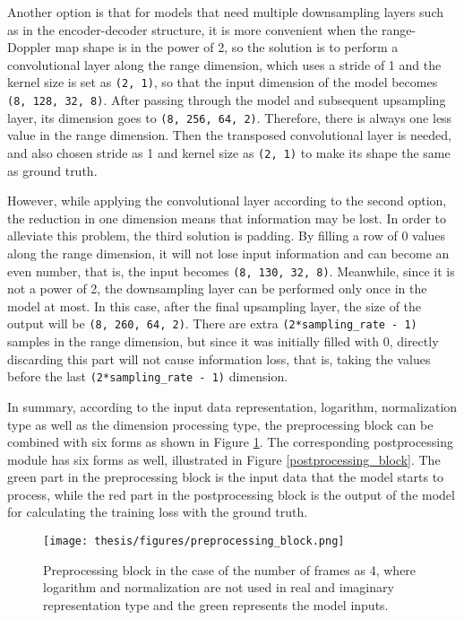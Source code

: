 Another option is that for models that need multiple downsampling layers such as in the encoder-decoder structure, it is more convenient when the range-Doppler map shape is in the power of 2, so the solution is to perform a convolutional layer along the range dimension, which uses a stride of 1 and the kernel size is set as \texttt{(2, 1)}, so that the input dimension of the model becomes \texttt{(8, 128, 32, 8)}. After passing through the model and subsequent upsampling layer, its dimension goes to \texttt{(8, 256, 64, 2)}. Therefore, there is always one less value in the range dimension. Then the transposed convolutional layer is needed, and also chosen stride as 1 and kernel size as \texttt{(2, 1)} to make its shape the same as ground truth.

However, while applying the convolutional layer according to the second option, the reduction in one dimension means that information may be lost. In order to alleviate this problem, the third solution is padding. By filling a row of 0 values along the range dimension, it will not lose input information and can become an even number, that is, the input becomes \texttt{(8, 130, 32, 8)}. Meanwhile, since it is not a power of 2, the downsampling layer can be performed only once in the model at most. In this case, after the final upsampling layer, the size of the output will be \texttt{(8, 260, 64, 2)}. There are extra \texttt{(2*sampling\_rate - 1)} samples in the range dimension, but since it was initially filled with 0, directly discarding this part will not cause information loss, that is, taking the values before the last \texttt{(2*sampling\_rate - 1)} dimension.

In summary, according to the input data representation, logarithm, normalization type as well as the dimension processing type, the preprocessing block can be combined with six forms as shown in Figure \ref{preprocessing_block}. The corresponding postprocessing module has six forms as well, illustrated in Figure \ref{postprocessing_block}. The green part in the preprocessing block is the input data that the model starts to process, while the red part in the postprocessing block is the output of the model for calculating the training loss with the ground truth.

\begin{figure}
	\centering
	\texttt{[image: thesis/figures/preprocessing\_block.png]}
	\caption{Preprocessing block in the case of the number of frames as 4, where logarithm and normalization are not used in real and imaginary representation type and the green represents the model inputs.}
	\label{preprocessing_block}
\end{figure}

